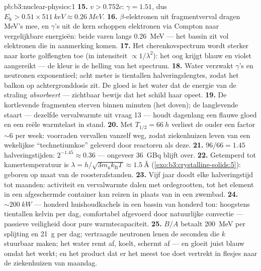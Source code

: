 \begin{solution}{pb:b3:nuclear-physics:1}
\textbf{15.} $v > 0.752c$: $\gamma = 1.51$, dus $E_{\text{k}} >
0.51\times\qty{511}{keV} \approx \qty{0.26}{MeV}$.
\textbf{16.} $\beta$-elektronen uit fragmentverval dragen
\unit{MeV}'s mee, en $\gamma$'s uit de kern schoppen elektronen via Compton naar
vergelijkbare energieën: beide varen langs \qty{0.26}{MeV} --- het bassin
zit vol elektronen die in aanmerking komen.
\textbf{17.} Het cherenkovspectrum wordt sterker naar korte
golflengten toe (in intensiteit $\propto1/\lambda^2$): het oog krijgt
blauw en violet aangereikt --- de kleur is de helling van het spectrum.
\textbf{18.} Water verzwakt $\gamma$'s en neutronen
exponentieel; acht meter is tientallen halveringslengtes, zodat
het balkon op achtergronddosis zit. De gloed is het water dat de
energie van de straling \emph{absorbeert} --- zichtbaar bewijs dat het
schild haar opeet.
\textbf{19.} De kortlevende fragmenten sterven binnen minuten
(het doven); de langlevende staart --- dezelfde vervalwarmte uit
vraag 13 --- houdt dagenlang een flauwe gloed en een reële warmtelast
in stand.
\textbf{20.} Met $T_{1/2} = \qty{66}{h}$ verliest de ouder een
factor ${\sim}6$ per week: voorraden vervallen vanzelf weg,
zodat ziekenhuizen leven van een wekelijkse ``technetiumkoe'' geleverd door
reactoren als deze.
\textbf{21.} $96/66 = 1.45$ halveringstijden: $2^{-1.45} \approx
0.36$ --- ongeveer \qty{36}{GBq} blijft over.
\textbf{22.} Getemperd tot kamertemperatuur is $\lambda =
h/\sqrt{3m_{\text{n}}k_{\text{B}}T} \approx \qty{1.5}{\angstrom}$
(\cref{exo:b3:crystalline-solids:5}): geboren op maat van de
roosterafstanden.
\textbf{23.} Vijf jaar doodt elke halveringstijd tot maanden:
activiteit en vervalwarmte dalen met ordegrootten, tot het
element in een afgeschermde container kan reizen in plaats van in een zwembad.
\textbf{24.} ${\sim}\qty{200}{kW}$ --- honderd huishoudkachels
in een bassin van honderd ton: hoogstens tientallen kelvin per dag,
comfortabel afgevoerd door natuurlijke convectie --- passieve
veiligheid door pure warmtecapaciteit.
\textbf{25.} $B/A$ betaalt \qty{200}{MeV} per splijting en \qty{21}{g}
per dag; vertraagde neutronen lenen de seconden die $k$
stuurbaar maken; het water remt af, koelt, schermt af --- en gloeit
juist blauw omdat het werkt; en het product dat er het meest toe doet
vertrekt in flesjes naar de ziekenhuizen van maandag.
\end{solution}
